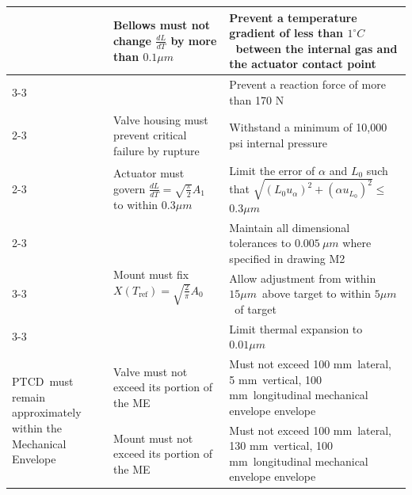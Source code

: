 \documentclass[12pt, letterpaper]{report}%
\newcommand{\device}{PTCD}
\newcommand{\degC}{^{\circ}C}    %
\newcommand{\dLdTTolValve}{$0.1 \mu m$}
\newcommand{\dTTol}{$1 \degC$}
\newcommand{\FTolValve}{170 N}
\newcommand{\valveMEX}{100 mm}
\newcommand{\valveMEY}{5 mm}
\newcommand{\valveMEZ}{100 mm}
\newcommand{\dLdTTolAct}{$0.3 \mu m$}
\newcommand{\mountdLTol}{$0.01 \mu m$}
\newcommand{\calRange}{$15 \mu m$}
\newcommand{\calTol}{$5 \mu m$}
\newcommand{\mountMEX}{100 mm}
\newcommand{\mountMEY}{130 mm}
\newcommand{\mountMEZ}{100 mm}
\begin{document}
\begin{appendices}
\begin{table}[H]
\begin{tabular}{|m{}|m{}|m{}|}
            &
        \multirow[c]{2}{0.3\textwidth}{%
            Bellows must not change $\frac{dL}{dT}$ by more than \dLdTTolValve\ %
        }
            &
        Prevent a temperature gradient of less than \dTTol\ between the internal gas and the actuator contact point
        \\ \cline{3-3}

            &
            &
        Prevent a reaction force of more than \FTolValve
        \\ \cline{2-3}

        &
        Valve housing must prevent critical failure by rupture
        &
        Withstand a minimum of 10{,}000 psi internal pressure
        \\ \cline{2-3}

            &
        Actuator must govern $\frac{dL}{dT} = \sqrt{\frac{\pi}{2}} A_1$ to within \dLdTTolAct\
            &
        Limit the error of $\alpha$ and $L_0$ such that
        $\sqrt{(L_0 u_\alpha)^2 + (\alpha u_{L_0})^2} \leq $\dLdTTolAct
        \\ \cline{2-3}

            &
        \multirow[c]{3}{0.3\textwidth}{%
            Mount must fix $X(T_{\text{ref}}) = \sqrt{\frac{2}{\pi}} A_0$ %
        }
            &
        Maintain all dimensional tolerances to $0.005\ \mu m$ where specified in drawing M2
        \\ \cline{3-3}

            &
            &
        Allow adjustment from within \calRange\ above target to within \calTol\ of target
        \\ \cline{3-3}

            &
            &
        Limit thermal expansion to \mountdLTol
        \\ \hline

        \multirow[c]{2}{0.2\textwidth}{%
            \device\ must remain approximately within the Mechanical Envelope
        }
            &
        Valve must not exceed its portion of the ME
            &
        Must not exceed \valveMEX\ lateral, \valveMEY\ vertical, \valveMEZ\ longitudinal mechanical envelope envelope
        \\ \cline{2-3}

            &
        Mount must not exceed its portion of the ME
            &
        Must not exceed \mountMEX\ lateral, \mountMEY\ vertical, \mountMEZ\ longitudinal mechanical envelope envelope
        

\end{tabular}
\end{table}
\end{appendices}
\end{document}
